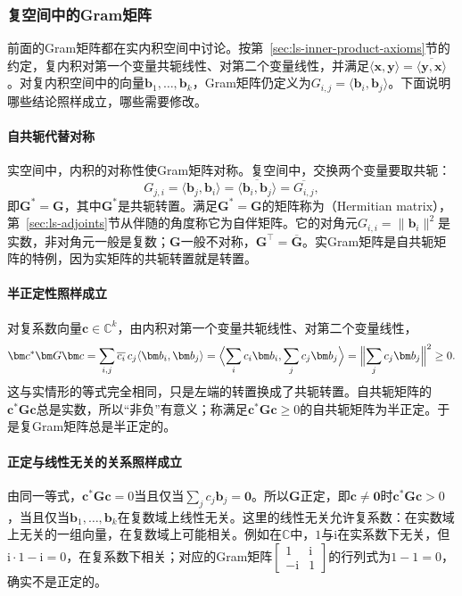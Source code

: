\subsubsection{复空间中的Gram矩阵}
\label{sec:ls-complex-gram}

前面的Gram矩阵都在实内积空间中讨论。按第~\ref{sec:ls-inner-product-axioms}节的约定，复内积对第一个变量共轭线性、对第二个变量线性，并满足$\langle\bm x,\bm y\rangle=\overline{\langle\bm y,\bm x\rangle}$。对复内积空间中的向量$\bm b_1,\ldots,\bm b_k$，Gram矩阵仍定义为$G_{i,j}=\langle\bm b_i,\bm b_j\rangle$。下面说明哪些结论照样成立，哪些需要修改。

\paragraph{自共轭代替对称}
实空间中，内积的对称性使Gram矩阵对称。复空间中，交换两个变量要取共轭：
\[
 G_{j,i}=\langle\bm b_j,\bm b_i\rangle=\overline{\langle\bm b_i,\bm b_j\rangle}=\overline{G_{i,j}},
\]
即$\bm G^*=\bm G$，其中$\bm G^*$是共轭转置。满足$\bm G^*=\bm G$的矩阵称为（Hermitian matrix），第~\ref{sec:ls-adjoints}节从伴随的角度称它为自伴矩阵。它的对角元$G_{i,i}=\lVert\bm b_i\rVert^2$是实数，非对角元一般是复数；$\bm G$一般不对称，$\bm G^\top=\overline{\bm G}$。实Gram矩阵是自共轭矩阵的特例，因为实矩阵的共轭转置就是转置。

\paragraph{半正定性照样成立}
对复系数向量$\bm c\in\mathbb C^k$，由内积对第一个变量共轭线性、对第二个变量线性，
\[
 \bm c^*\bm G\bm c=\sum_{i,j}\overline{c_i}\,c_j\langle\bm b_i,\bm b_j\rangle
 =\Bigl\langle\sum_ic_i\bm b_i,\sum_jc_j\bm b_j\Bigr\rangle
 =\Bigl\lVert\sum_jc_j\bm b_j\Bigr\rVert^2\geq0 .
\]
这与实情形的等式完全相同，只是左端的转置换成了共轭转置。自共轭矩阵的$\bm c^*\bm G\bm c$总是实数，所以“非负”有意义；称满足$\bm c^*\bm G\bm c\geq0$的自共轭矩阵为半正定。于是复Gram矩阵总是半正定的。

\paragraph{正定与线性无关的关系照样成立}
由同一等式，$\bm c^*\bm G\bm c=0$当且仅当$\sum_jc_j\bm b_j=\bm0$。所以$\bm G$正定，即$\bm c\neq\bm0$时$\bm c^*\bm G\bm c>0$，当且仅当$\bm b_1,\ldots,\bm b_k$在复数域上线性无关。这里的线性无关允许复系数：在实数域上无关的一组向量，在复数域上可能相关。例如在$\mathbb C$中，$1$与$\mathrm i$在实系数下无关，但$\mathrm i\cdot1-\mathrm i=0$，在复系数下相关；对应的Gram矩阵$\begin{bmatrix}1&\mathrm i\\-\mathrm i&1\end{bmatrix}$的行列式为$1-1=0$，确实不是正定的。

